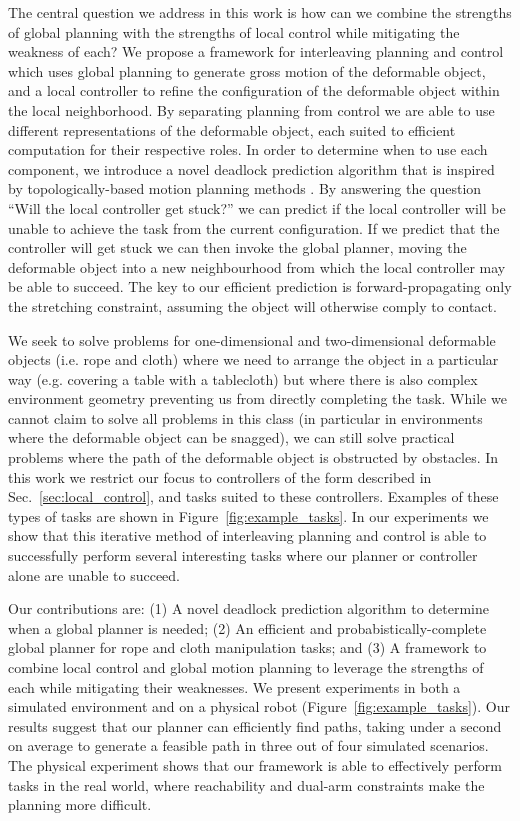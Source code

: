 The central question we address in this work is how can we combine the strengths of global planning with the strengths of local control while mitigating the weakness of each? We propose a framework for interleaving planning and control which uses global planning to generate gross motion of the deformable object, and a local controller to refine the configuration of the deformable object within the local neighborhood. By separating planning from control we are able to use different representations of the deformable object, each suited to efficient computation for their respective roles. In order to determine when to use each component, we introduce a novel deadlock prediction algorithm that is inspired by topologically-based motion planning methods \citep{Bhattacharya2012,Jaillet2008}. By answering the question ``Will the local controller get stuck?'' we can predict if the local controller will be unable to achieve the task from the current configuration. If we predict that the controller will get stuck we can then invoke the global planner, moving the deformable object into a new neighbourhood from which the local controller may be able to succeed. The key to our efficient prediction is forward-propagating only the stretching constraint, assuming the object will otherwise comply to contact.

We seek to solve problems for one-dimensional and two-dimensional deformable objects (i.e. rope and cloth) where we need to arrange the object in a particular way (e.g. covering a table with a tablecloth) but where there is also complex environment geometry preventing us from directly completing the task. While we cannot claim to solve all problems in this class (in particular in environments where the deformable object can be snagged), we can still solve practical problems where the path of the deformable object is obstructed by obstacles. In this work we restrict our focus to controllers of the form described in Sec.~\ref{sec:local_control}, and tasks suited to these controllers. Examples of these types of tasks are shown in Figure~\ref{fig:example_tasks}. In our experiments we show that this iterative method of interleaving planning and control is able to successfully perform several interesting tasks where our planner or controller alone are unable to succeed.

Our contributions are: (1) A novel deadlock prediction algorithm to determine when a global planner is needed; (2) An efficient and probabistically-complete global planner for rope and cloth manipulation tasks; and (3) A framework to combine local control and global motion planning to leverage the strengths of each while mitigating their weaknesses. We present experiments in both a simulated environment and on a physical robot (Figure~\ref{fig:example_tasks}). Our results suggest that our planner can efficiently find paths, taking under a second on average to generate a feasible path in three out of four simulated scenarios. The physical experiment shows that our framework is able to effectively perform tasks in the real world, where reachability and dual-arm constraints make the planning more difficult.







